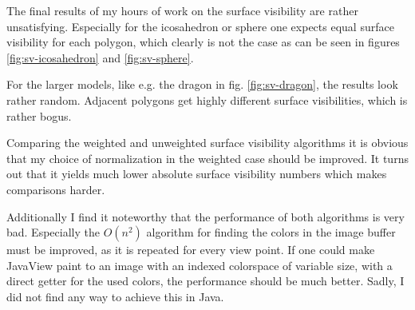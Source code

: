 \documentclass[a4paper,10pt,notitlepage]{scrreprt}
\begin{document}
The final results of my hours of work on the surface visibility are rather
unsatisfying. Especially for the icosahedron or sphere one expects equal
surface visibility for each polygon, which clearly is not the case as can be
seen in figures \ref{fig:sv-icosahedron} and \ref{fig:sv-sphere}.

For the larger models, like e.g. the dragon in fig. \ref{fig:sv-dragon}, the
results look rather random. Adjacent polygons get highly different surface
visibilities, which is rather bogus.

Comparing the weighted and unweighted surface visibility algorithms it is
obvious that my choice of normalization in the weighted case should be
improved. It turns out that it yields much lower absolute surface visibility
numbers which makes comparisons harder.

Additionally I find it noteworthy that the performance of both algorithms is
very bad. Especially the $O(n^2)$ algorithm for finding the colors in the
image buffer must be improved, as it is repeated for every view point. If one
could make JavaView paint to an image with an indexed colorspace of variable
size, with a direct getter for the used colors, the performance should be much
better. Sadly, I did not find any way to achieve this in Java.
\end{document}
